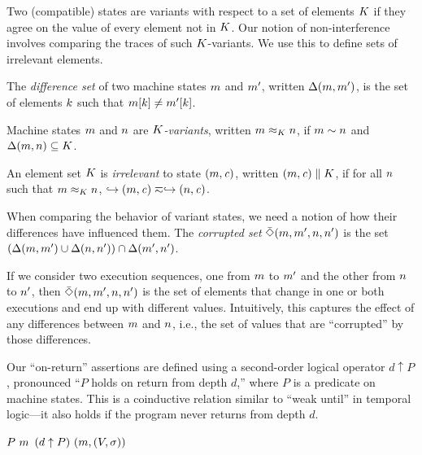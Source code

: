 \documentclass[10pt,conference]{ieeetran}%
\theoremstyle{definition}
\begin{document}
Two (compatible) states are variants with respect to a set of elements \(K\)
if they agree on the value of every element not in \(K\).
Our notion of non-interference involves comparing the traces of such
\(K\)-variants. We use this to define sets of irrelevant elements.

 The \emph{difference set} of two machine states \(m\) and \(m'\),
written \(\Delta(m,m')\),
is the set of elements \(k\) such that \(m[k] \not = m'[k]\).

 Machine states \(m\) and \(n\) are {\em \(K\)-variants},
written \(m \approx_K n\), if \(m\sim n\) and
\(\Delta(m,n) \subseteq K\).

 An element set \(K\) is \emph{irrelevant} to state \((m,\mathit{c})\),
written \((m,\mathit{c}) \parallel K\), if for all
\(n\) such that \(m \approx_{K} n\),
\(\hookrightarrow (m,\mathit{c})  \eqsim \hookrightarrow (n,\mathit{c})\).


When comparing the behavior of variant states, we need a notion of how their
differences have influenced them.
 The {\em corrupted set} \(\bar{\Diamond}(m,m',n,n')\)
is the set \((\Delta(m,m') \cup \Delta(n,n')) \cap \Delta(m',n')\).

If we consider two execution sequences, one from \(m\) to \(m'\)
and the other from \(n\) to \(n'\),
then \(\bar{\Diamond}(m,m',n,n')\) is the set of elements that
change in one or both executions and end up with different values. Intuitively,
this captures the effect of any differences between \(m\) and \(n\), i.e.,
the set of values that are ``corrupted'' by those differences.

Our ``on-return'' assertions are defined using a second-order logical operator
\(d \uparrow P\), pronounced ``\(P\) holds on return from depth \(d\),''
where \(P\) is a predicate on machine states. This is a coinductive relation
similar to ``weak until'' in temporal logic---it also holds if the program never
returns from depth \(d\).

            {\(P ~ m\)}
            {\((d \uparrow P) ~ (m, (V,\sigma))\)}
\end{document}
